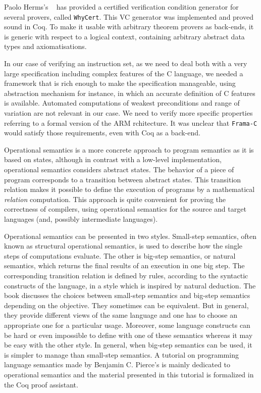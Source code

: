 \documentclass[twocolumn]{article}
\newcommand{\whyCert}{\texttt{WhyCert}\xspace}
\newcommand{\framac}{\texttt{Frama-C}\xspace}
\begin{document}
Paolo Herms's \cite{herms13phd}~\cite{herms2012certified} has provided
a certified verification condition generator for several provers,
called \whyCert.  This VC generator was implemented and proved sound
in Coq.  To make it usable with arbitrary theorem provers as
back-ends, it is generic with respect to a logical context, containing
arbitrary abstract data types and axiomatisations.

In our case of verifying an instruction set, as we need to deal both
with a very large specification including complex features of the C
language, we needed a framework that is rich enough to make the
specification manageable, using abstraction mechanism for instance,
in which an accurate definition of C features is available.
Automated computations of weakest preconditions
and range of variation are not relevant in our case.
We need to verify more specific properties referring
to a formal version of the ARM rchitecture.
It was unclear that \framac would satisfy those requirements,
even with Coq as a back-end.

Operational semantics is a more concrete approach to program semantics
as it is based on states, although in contrast with a low-level
implementation, operational semantics considers abstract states.  The
behavior of a piece of program corresponds to a transition between
abstract states.  This transition relation makes it possible to define
the execution of programs by a mathematical \emph{relation}
computation.  This approach is quite convenient for proving the
correctness of compilers, using operational semantics for the source
and target languages (and, possibly intermediate languages).

Operational semantics can be presented in two styles.  Small-step
semantics, often known as structural operational semantics, is used to
describe how the single steps of computations evaluate.  The other is
big-step semantics, or natural semantics, which returns the final
results of an execution in one big step.  The corresponding transition
relation is defined by rules, according to the syntactic constructs of
the language, in a style which is inspired by natural deduction. The
book \cite{nielson1992semantics} discusses the choices between
small-step semantics and big-step semantics depending on the
objective.  They sometimes can be equivalent.  But in general, they
provide different views of the same language and one has to choose an
appropriate one for a particular usage.  Moreover, some language
constructs can be hard or even impossible to define with one of these
semantics whereas it may be easy with the other style.  In general,
when big-step semantics can be used, it is simpler to manage than
small-step semantics. A tutorial on programming language semantics
made by Benjamin C. Pierce's \cite{pierce-tut} is mainly dedicated to
operational semantics and the material presented in this tutorial is
formalized in the Coq proof assistant.
\end{document}
